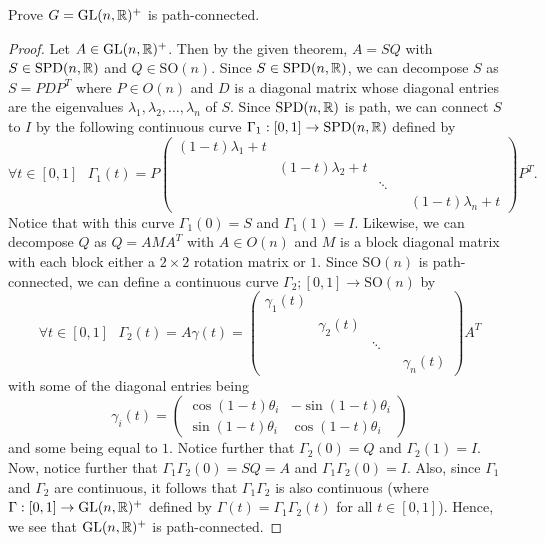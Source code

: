 \documentclass{article}
\begin{document}
\begin{problem} 
    Prove \( G = \text{GL}(n,\mathbb{R})^{+}   \) is path-connected.
\end{problem}
\begin{proof}
    Let \( A \in \text{GL}(n,\mathbb{R})^{+}  \). Then by the given theorem, \( A = SQ \) with \( S \in \text{SPD}(n,\mathbb{R})  \) and \( Q \in \text{SO}(n)  \). Since \( S \in \text{SPD}(n,\mathbb{R})  \), we can decompose \( S  \) as \( S = P D P^{T} \) where \( P \in O(n) \) and \( D  \) is a diagonal matrix whose diagonal entries are the eigenvalues \( {\lambda}_{1}, {\lambda}_{2}, \dots, {\lambda}_{n} \) of \( S  \). Since \( \text{SPD}(n,\mathbb{R})  \) is path, we can connect \( S  \) to \( I  \) by the following continuous curve \( {\Gamma}_{1} : [0,1] \to \text{SPD}(n,\mathbb{R})  \) defined by  
    \[ \forall t \in [0,1] \ \ \ {\Gamma}_{1}(t) = P \begin{pmatrix} (1-t){\lambda}_{1} + t &  & \\ & (1-t){\lambda}_{2} + t  & &  \\  & & \ddots  &  \\ & & & & (1-t){\lambda}_{n} + t  \end{pmatrix} P^{T}.   \]
    Notice that with this curve \( {\Gamma}_{1}(0) = S  \) and \( {\Gamma}_{1}(1) = I  \). Likewise, we can decompose \( Q  \) as \( Q = A M A^{T} \) with \( A \in O(n) \) and \(  M  \) is a block diagonal matrix with each block either a \( 2 \times 2  \) rotation matrix or \( 1  \). Since \( \text{SO}(n)   \) is path-connected, we can define a continuous curve \( {\Gamma}_{2} ; [0,1] \to \text{SO}(n)  \) by  
    \[  \forall t \in [0,1] \ \ \ {\Gamma}_{2}(t) = A \gamma(t) = \begin{pmatrix} {\gamma}_{1}(t) &  & \\ & {\gamma}_{2}(t) & &  \\  & & \ddots  &  \\ & & & & {\gamma}_{n}(t) \end{pmatrix} A^{T}  
  \]
  with some of the diagonal entries being
  \[  {\gamma}_{i}(t) = \begin{pmatrix} \cos (1-t) {\theta}_{i} & - \sin (1-t) {\theta}_{i} \\ \sin (1-t) {\theta}_{i} & \cos (1-t) {\theta}_{i} \end{pmatrix}   \]
  and some being equal to \( 1  \). Notice further that \( {\Gamma}_{2}(0) = Q  \) and \( {\Gamma}_{2}(1) = I  \). Now, notice further that \( {\Gamma}_{1} {\Gamma}_{2} (0) = SQ = A  \) and \( {\Gamma}_{1} {\Gamma}_{2} (0) = I  \). Also, since \( {\Gamma}_{1} \) and \( {\Gamma}_{2} \) are continuous, it follows that \( {\Gamma}_{1} {\Gamma}_{2}  \) is also continuous (where \( \Gamma: [0,1] \to \text{GL}(n,\mathbb{R})^{+}  \) defined by \( \Gamma(t) = {\Gamma}_{1} {\Gamma}_{2} (t)  \) for all \( t \in [0,1] \)). Hence, we see that \( \text{GL}(n,\mathbb{R})^{+}   \) is path-connected.
          \end{proof}
\end{document}

